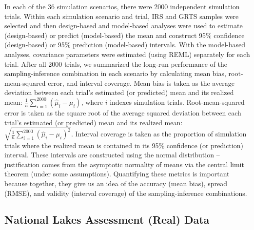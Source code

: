 \documentclass[]{elsarticle} %
\begin{document}
In each of the 36 simulation scenarios, there were 2000 independent
simulation trials. Within each simulation scenario and trial, IRS and
GRTS samples were selected and then design-based and model-based
analyses were used to estimate (design-based) or predict (model-based)
the mean and construct 95\% confidence (design-based) or 95\% prediction
(model-based) intervals. With the model-based analyses, covariance
parameters were estimated (using REML) separately for each trial. After
all 2000 trials, we summarized the long-run performance of the
sampling-inference combination in each scenario by calculating mean
bias, root-mean-squared error, and interval coverage. Mean bias is taken
as the average deviation between each trial's estimated (or predicted)
mean and its realized mean:
\(\frac{1}{n}\sum_{i = 1}^{2000} (\hat{\mu}_i - \mu_i)\), where \(i\)
indexes simulation trials. Root-mean-squared error is taken as the
square root of the average squared deviation between each trial's
estimated (or predicted) mean and its realized mean:
\(\sqrt{\frac{1}{n}\sum_{i = 1}^{2000} (\hat{\mu}_i - \mu_i)^2}\).
Interval coverage is taken as the proportion of simulation trials where
the realized mean is contained in its 95\% confidence (or prediction)
interval. These intervals are constructed using the normal distribution
-- justification comes from the asymptotic normality of means via the
central limit theorem (under some assumptions). Quantifying these
metrics is important because together, they give us an idea of the
accuracy (mean bias), spread (RMSE), and validity (interval coverage) of
the sampling-inference combinations.

\hypertarget{sec:mm_app}{%
\subsection{National Lakes Assessment (Real) Data}\label{sec:mm_app}}
\end{document}
